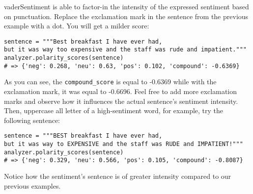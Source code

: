 	vaderSentiment is able to factor-in the intensity of the expressed sentiment based on punctuation. Replace the exclamation mark in the sentence from the previous example with a dot. You will get a milder score:
	\begin{verbatim}
sentence = """Best breakfast I have ever had,
but it was way too expensive and the staff was rude and impatient."""
analyzer.polarity_scores(sentence)
# => {'neg': 0.268, 'neu': 0.63, 'pos': 0.102, 'compound': -0.6369}
	\end{verbatim}
	As you can see, the \verb|compound_score| is equal to -0.6369 while with the exclamation mark, it was equal to -0.6696. Feel free to add more exclamation marks and observe how it influences the actual sentence's sentiment intensity. Then, uppercase all letter of a high-sentiment word, for example, try the following sentence:
	\begin{Verbatim}
sentence = """BEST breakfast I have ever had,
but it was way to EXPENSIVE and the staff was RUDE and IMPATIENT!"""
analyzer.polarity_scores(sentence)
# => {'neg': 0.329, 'neu': 0.566, 'pos': 0.105, 'compound': -0.8087}
	\end{Verbatim}
	Notice how the sentiment's sentence is of greater intensity compared to our previous examples.

